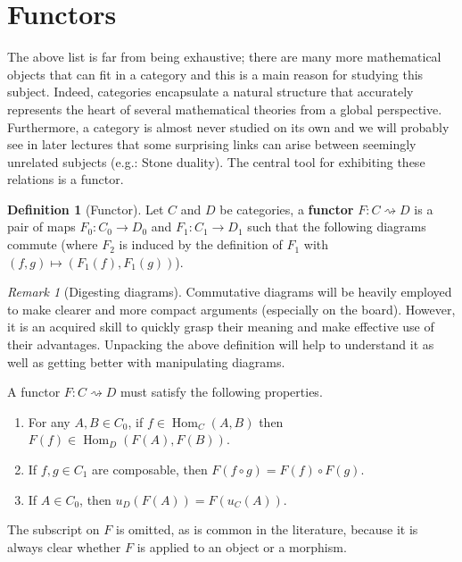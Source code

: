 \documentclass{article}
\theoremstyle{definition}
\newtheorem{defn}[thm]{Definition}
\theoremstyle{remark}
\newtheorem{rem}[thm]{Remark}
\DeclareMathOperator{\Hom}{Hom}
\begin{document}
\section{Functors}
The above list is far from being exhaustive; there are many more mathematical objects that can fit in a category and this is a main reason for studying this subject. Indeed, categories encapsulate a natural structure that accurately represents the heart of several mathematical theories from a global perspective. Furthermore, a category is almost never studied on its own and we will probably see in later lectures that some surprising links can arise between seemingly unrelated subjects (e.g.: Stone duality). The central tool for exhibiting these relations is a functor.
\begin{defn}[Functor]
	Let $C$ and $D$ be categories, a \textbf{functor} $F: C \rightsquigarrow D$ is a pair of maps $F_0:C_0 \rightarrow D_0$ and $F_1:C_1 \rightarrow D_1$ such that the following diagrams commute (where $F_2$ is induced by the definition of $F_1$ with $(f,g) \mapsto (F_1(f), F_1(g))$).
	\begin{figure}[h]
		\centering
		\qquad 
		\qquad
	\end{figure}
\end{defn}
\begin{rem}[Digesting diagrams]
	Commutative diagrams will be heavily employed to make clearer and more compact arguments (especially on the board). However, it is an acquired skill to quickly grasp their meaning and make effective use of their advantages. Unpacking the above definition will help to understand it as well as getting better with manipulating diagrams.
	
	A functor $F:C\rightsquigarrow D$ must satisfy the following properties.
	\begin{enumerate}
		\item For any $A, B \in C_0$, if $f \in \Hom_C(A,B)$ then $F(f) \in \Hom_D(F(A), F(B))$.
		\item If $f,g \in C_1$ are composable, then $F(f\circ g) = F(f) \circ F(g)$.
		\item If $A \in C_0$, then $u_D(F(A)) = F(u_C(A))$.
	\end{enumerate}
	The subscript on $F$ is omitted, as is common in the literature, because it is always clear whether $F$ is applied to an object or a morphism.
\end{rem}
\end{document}
